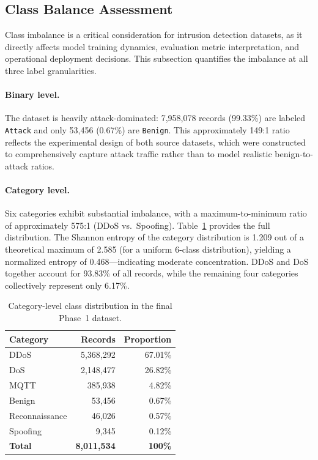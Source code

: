 \subsection{Class Balance Assessment}
\label{subsec:class-balance}

Class imbalance is a critical consideration for intrusion detection datasets, as it directly affects model training dynamics, evaluation metric interpretation, and operational deployment decisions. This subsection quantifies the imbalance at all three label granularities.

\paragraph{Binary level.}
The dataset is heavily attack-dominated: 7,958,078 records (99.33\%) are labeled \texttt{Attack} and only 53,456 (0.67\%) are \texttt{Benign}. This approximately 149:1 ratio reflects the experimental design of both source datasets, which were constructed to comprehensively capture attack traffic rather than to model realistic benign-to-attack ratios.

\paragraph{Category level.}
Six categories exhibit substantial imbalance, with a maximum-to-minimum ratio of approximately 575:1 (DDoS vs.\ Spoofing). Table~\ref{tab:class-balance} provides the full distribution. The Shannon entropy of the category distribution is 1.209 out of a theoretical maximum of 2.585 (for a uniform 6-class distribution), yielding a normalized entropy of 0.468---indicating moderate concentration. DDoS and DoS together account for 93.83\% of all records, while the remaining four categories collectively represent only 6.17\%.

\begin{table}[H]
\centering
\caption{Category-level class distribution in the final Phase~1 dataset.}
\label{tab:class-balance}
\small
\begin{tabular}{@{}l r r@{}}
\toprule
\textbf{Category} & \textbf{Records} & \textbf{Proportion} \\
\midrule
DDoS & 5,368,292 & 67.01\% \\
DoS & 2,148,477 & 26.82\% \\
MQTT & 385,938 & 4.82\% \\
Benign & 53,456 & 0.67\% \\
Reconnaissance & 46,026 & 0.57\% \\
Spoofing & 9,345 & 0.12\% \\
\midrule
\textbf{Total} & \textbf{8,011,534} & \textbf{100\%} \\
\bottomrule
\end{tabular}
\end{table}

